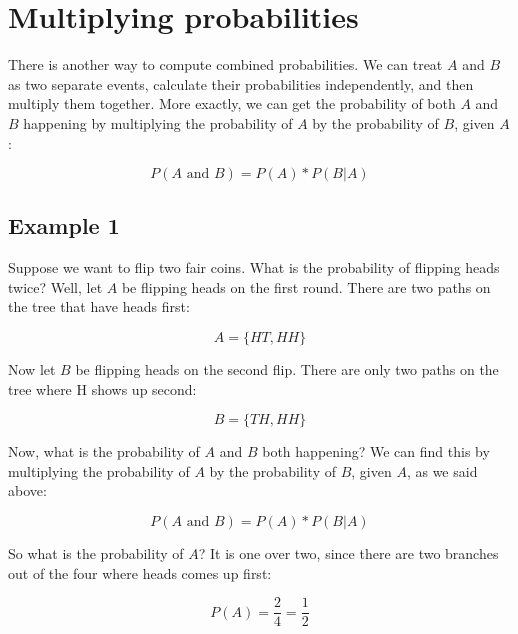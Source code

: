 \documentclass[../../../main.tex]{subfiles}
\begin{document}
\section{Multiplying probabilities}

There is another way to compute combined probabilities. We can treat $A$ and $B$ as two separate events, calculate their probabilities independently, and then multiply them together. More exactly, we can get the probability of both $A$ and $B$ happening by multiplying the probability of $A$ by the probability of $B$, given $A$:

\begin{equation*}
  P(A \text{ and } B) = P(A) * P(B | A)
\end{equation*}


\subsection{Example 1}

Suppose we want to flip two fair coins. What is the probability of flipping heads twice? Well, let $A$ be flipping heads on the first round. There are two paths on the tree that have heads first:

\begin{equation*}
  A = \{ HT, HH \}
\end{equation*}

\noindent
Now let $B$ be flipping heads on the second flip. There are only two paths on the tree where H shows up second:

\begin{equation*}
  B = \{ TH, HH \}
\end{equation*}

\noindent
Now, what is the probability of $A$ and $B$ both happening? We can find this by multiplying the probability of $A$ by the probability of $B$, given $A$, as we said above:

\begin{equation*}
  P(A \text{ and } B) = P(A) * P(B | A)
\end{equation*}

\noindent
So what is the probability of $A$? It is one over two, since there are two branches out of the four where heads comes up first:

\begin{equation*}
  P(A) = \frac{2}{4} = \frac{1}{2}
\end{equation*}
\end{document}
